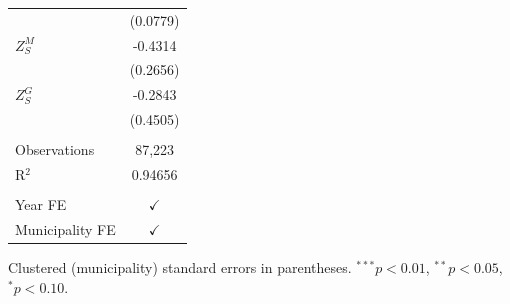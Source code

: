 \begin{tabular}{lc}
                   & (0.0779)\\   
   $Z^{M}_S$       & -0.4314\\   
                   & (0.2656)\\   
   $Z^{G}_S$       & -0.2843\\   
                   & (0.4505)\\   
    \\
   Observations    & 87,223\\  
   R$^2$           & 0.94656\\  
    \\
   Year FE         & $\checkmark$\\   
   Municipality FE & $\checkmark$\\   
   \bottomrule
\end{tabular}
 
\par \raggedright 
Clustered (municipality) standard errors in parentheses. $^{***}p<0.01$, $^{**}p<0.05$, $^{*}p<0.10$.
\par\endgroup
